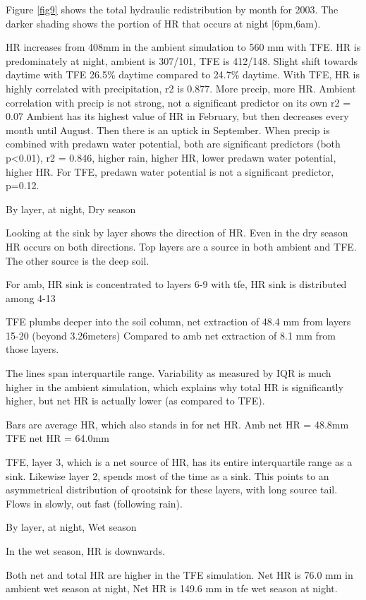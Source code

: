 \documentclass[draft,linenumbers]{agujournal}
\begin{document}
Figure \ref{fig9} shows the total hydraulic redistribution by month for 2003.
The darker shading shows the portion of HR that occurs at night [6pm,6am). 

HR increases from 408mm in the ambient simulation to 560 mm with TFE.
HR is predominately at night, ambient is 307/101, TFE is 412/148. 
Slight shift towards daytime with TFE 26.5\% daytime compared to 24.7\% daytime.
With TFE, HR is highly correlated with precipitation, r2 is 0.877. More precip, more HR.
Ambient correlation with precip is not strong, not a significant predictor on its own r2 = 0.07
Ambient has its highest value of HR in February, but then decreases every month until August.
Then there is an uptick in September. 
When precip is combined with predawn water potential, both are significant predictors (both p<0.01), r2 = 0.846,
higher rain, higher HR, lower predawn water potential, higher HR.
For TFE, predawn water potential is not a significant predictor, p=0.12.

By layer, at night, Dry season

Looking at the sink by layer shows the direction of HR.
Even in the dry season HR occurs on both directions.
Top layers are a source in both ambient and TFE. The other source is the deep soil.

For amb, HR sink is concentrated to layers 6-9
with tfe, HR sink is distributed among 4-13

TFE plumbs deeper into the soil column, net extraction of 48.4 mm from layers 15-20 (beyond 3.26meters)
Compared to amb net extraction of 8.1 mm from those layers.

The lines span interquartile range. 
Variability as measured by IQR is much higher in the ambient simulation, which explains why total HR is significantly higher, 
but net HR is actually lower (as compared to TFE). 

Bars are average HR, which also stands in for net HR.
Amb net HR = 48.8mm 
TFE net HR = 64.0mm

TFE, layer 3, which is a net source of HR, has its entire interquartile range as a sink.
Likewise layer 2, spends most of the time as a sink.
This points to an asymmetrical distribution of qrootsink for these layers, with long source tail. Flows in slowly, out fast (following rain).

By layer, at night, Wet season

In the wet season, HR is downwards.

Both net and total HR are higher in the TFE simulation. 
Net HR is 76.0 mm in ambient wet season at night,
Net HR is 149.6 mm in tfe wet season at night.
\end{document}
